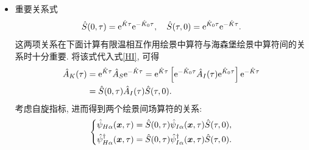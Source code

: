 \begin{itemize}
由归一性和传递性, 有
\begin{align}
\hat{S}\left(\tau_1, \tau_3\right) \hat{S}\left(\tau_3, \tau_1\right)=\hat{S}\left(\tau_1, \tau_1\right)=\mathbbm{1},\nonumber\\
\hat{S}\left(\tau_3, \tau_1\right) \hat{S}\left(\tau_1, \tau_3\right)=\hat{S}\left(\tau_3, \tau_3\right)=\mathbbm{1}.
\end{align}
由此可以定义逆算符:
\begin{equation}
\hat{S}^{-1}\left(\tau, \tau^{\prime}\right)=\hat{S}\left(\tau^{\prime}, \tau\right).
\end{equation}
这里算符的逆是指对于任意算符 $\hat A$, 如果存在算符 $\hat B$ 满足: $\hat{A} \hat{B}=\mathbbm{1}$, $\hat{B} \hat{A}=\mathbbm{1}$, 则称 $\hat{B}$ 是 $\hat{A}$ 的逆, 记为 $\hat{A}^{-1}$.
\item 重要关系式
\begin{equation}
\hat{S}(0, \tau)=\mathrm{e}^{\hat{K} \tau} \mathrm{e}^{-\hat{K}_0 \tau},\quad \hat{S}(\tau, 0)=\mathrm{e}^{\hat{K}_0 \tau} \mathrm{e}^{-\hat{K} \tau}.
\end{equation}
这两项关系在下面计算有限温相互作用绘景中算符与海森堡绘景中算符间的关系时十分重要. 将该式代入式\eqref{HI}, 可得
\begin{align}
\hat{A}_K(\tau) & =\mathrm{e}^{\hat{K} \tau} \hat{A}_S \mathrm{e}^{-\hat{K} \tau}=\mathrm{e}^{\hat{K} \tau}\left[\mathrm{e}^{-\hat{K}_0 \tau} \hat{A}_I(\tau) \mathrm{e}^{\hat{K}_0 \tau}\right] \mathrm{e}^{-\hat{K} \tau} \nonumber\\
& =\hat{S}(0, \tau) \hat{A}_I(\tau) \hat{S}(\tau, 0).
\end{align}
考虑自旋指标, 进而得到两个绘景间场算符的关系:
\begin{equation}
\left\{\begin{aligned}
\hat{\psi}_{H \alpha}(\boldsymbol{x}, \tau)&=\hat{S}(0, \tau)\hat{\psi}_{I \alpha}(\boldsymbol{x}, \tau)\hat{S}(\tau, 0), \\
\hat{\psi}_{H \alpha}^{\dagger}(\boldsymbol{x}, \tau)&=\hat{S}(0, \tau)\hat{\psi}_{I \alpha}^{\dagger}(\boldsymbol{x}, \tau) \hat{S}(\tau, 0).
\end{aligned}\right.
\end{equation}
\end{itemize}


